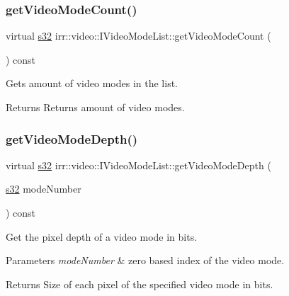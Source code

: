 \subsubsection{\texorpdfstring{get\+Video\+Mode\+Count()}{getVideoModeCount()}}
{\footnotesize\ttfamily virtual \hyperlink{namespaceirr_ac66849b7a6ed16e30ebede579f9b47c6}{s32} irr\+::video\+::\+I\+Video\+Mode\+List\+::get\+Video\+Mode\+Count (\begin{DoxyParamCaption}{ }\end{DoxyParamCaption}) const\hspace{0.3cm}{\ttfamily [pure virtual]}}



Gets amount of video modes in the list. 

\begin{DoxyReturn}{Returns}
Returns amount of video modes. 
\end{DoxyReturn}
\mbox{\label{classirr_1_1video_1_1IVideoModeList_ae3f4b101eacbebe78d6a2e1a3f2e713d}} 
\subsubsection{\texorpdfstring{get\+Video\+Mode\+Depth()}{getVideoModeDepth()}}
{\footnotesize\ttfamily virtual \hyperlink{namespaceirr_ac66849b7a6ed16e30ebede579f9b47c6}{s32} irr\+::video\+::\+I\+Video\+Mode\+List\+::get\+Video\+Mode\+Depth (\begin{DoxyParamCaption}\item[{\hyperlink{namespaceirr_ac66849b7a6ed16e30ebede579f9b47c6}{s32}}]{mode\+Number }\end{DoxyParamCaption}) const\hspace{0.3cm}{\ttfamily [pure virtual]}}



Get the pixel depth of a video mode in bits. 


\begin{DoxyParams}{Parameters}
{\em mode\+Number} & zero based index of the video mode. \\
\hline
\end{DoxyParams}
\begin{DoxyReturn}{Returns}
Size of each pixel of the specified video mode in bits. 
\end{DoxyReturn}
\mbox{\label{classirr_1_1video_1_1IVideoModeList_af8409c756780c3566c94596cf7f94fc3}} 
